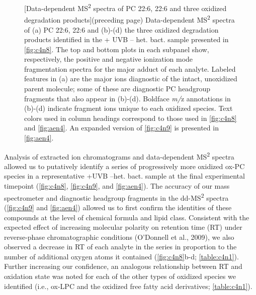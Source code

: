 \begin{figure} [!t]
[Data-dependent MS\textsuperscript{2} spectra of PC 22:6, 22:6 and three oxidized degradation products]{(preceding page) Data-dependent MS\textsuperscript{2} spectra of (a) PC 22:6, 22:6 and (b)-(d) the three oxidized degradation products identified in the + UVB -- het. bact. sample presented in \autoref{fig:c4n8}. The top and bottom plots in each subpanel show, respectively, the positive and negative ionization mode fragmentation spectra for the major adduct of each analyte. Labeled features in (a) are the major ions diagnostic of the intact, unoxidized parent molecule; some of these are diagnostic PC headgroup fragments that also appear in (b)-(d). Boldface \emph{m/}z annotations in (b)-(d) indicate fragment ions unique to each oxidized species. Text colors used in column headings correspond to those used in \autoref{fig:c4n8} and \autoref{fig:aen4}. An expanded version of \autoref{fig:c4n9} is presented in \autoref{fig:aen4}.}
\label{fig:c4n9}
\end{figure}

Analysis of extracted ion chromatograms and data-dependent MS\textsuperscript{2} spectra allowed us to putatively identify a series of progressively more oxidized ox-PC species in a representative +UVB --het. bact. sample at the final experimental timepoint (\autoref{fig:c4n8}, \autoref{fig:c4n9}, and \autoref{fig:aen4}). The accuracy of our mass spectrometer and diagnostic headgroup fragments in the dd-MS\textsuperscript{2} spectra (\autoref{fig:c4n9} and \autoref{fig:aen4}) allowed us to first confirm the identities of these compounds at the level of chemical formula and lipid class. Consistent with the expected effect of increasing molecular polarity on retention time (RT) under reverse-phase chromatographic conditions (O'Donnell et al., 2009), we also observed a decrease in RT of each analyte in the series in proportion to the number of additional oxygen atoms it contained (\autoref{fig:c4n8}b-d; \autoref{table:c4n1}). Further increasing our confidence, an analogous relationship between RT and oxidation state was noted for each of the other types of oxidized species we identified (i.e., ox-LPC and the oxidized free fatty acid derivatives; \autoref{table:c4n1}).

